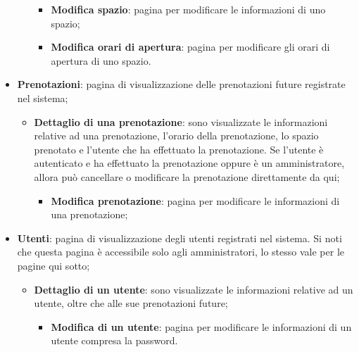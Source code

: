 \begin{itemize}
\begin{itemize}
		            \begin{itemize}
			            \item \textbf{Modifica spazio}: pagina per modificare le
			                  informazioni di uno spazio;

			            \item \textbf{Modifica orari di apertura}: pagina per
			                  modificare gli orari di apertura di uno spazio.
		            \end{itemize}
	      \end{itemize}

	\item \textbf{Prenotazioni}: pagina di visualizzazione delle prenotazioni
	      future registrate nel sistema;

	      \begin{itemize}
		      \item \textbf{Dettaglio di una prenotazione}: sono visualizzate le
		            informazioni relative ad una prenotazione, l'orario della
		            prenotazione, lo spazio prenotato e l'utente che ha
		            effettuato la prenotazione. Se l'utente è autenticato e ha
		            effettuato la prenotazione oppure è un amministratore,
		            allora può cancellare o modificare la prenotazione
		            direttamente da qui;

		            \begin{itemize}
			            \item \textbf{Modifica prenotazione}: pagina per
			                  modificare le informazioni di una prenotazione;
		            \end{itemize}
	      \end{itemize}

	\item \textbf{Utenti}: pagina di visualizzazione degli utenti registrati nel
	      sistema. Si noti che questa pagina è accessibile solo agli
	      amministratori, lo stesso vale per le pagine qui sotto;

	      \begin{itemize}
		      \item \textbf{Dettaglio di un utente}: sono visualizzate le
		            informazioni relative ad un utente, oltre che alle sue
		            prenotazioni future;

		            \begin{itemize}
			            \item \textbf{Modifica di un utente}: pagina per
			                  modificare le informazioni di un utente compresa
			                  la password.
		            \end{itemize}
	      \end{itemize}
\end{itemize}

